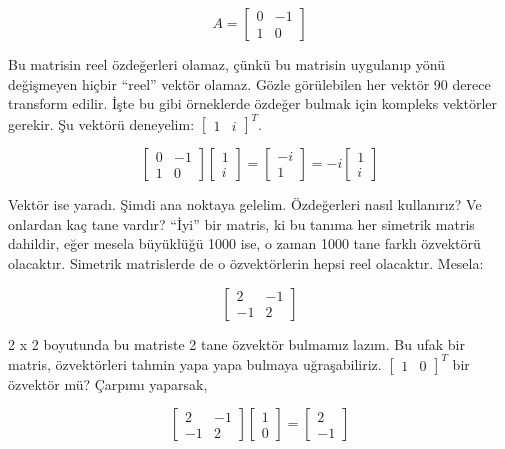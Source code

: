 \documentclass[12pt,fleqn]{article}\usepackage{../../common}
\begin{document}
$$ 
A = 
\left[
\begin{array}{rr}
0 & -1 \\
1 & 0
\end{array}
\right]
 $$

Bu matrisin reel özdeğerleri olamaz, çünkü bu matrisin uygulanıp yönü değişmeyen
hiçbir ``reel'' vektör olamaz. Gözle görülebilen her vektör 90 derece transform
edilir. İşte bu gibi örneklerde özdeğer bulmak için kompleks vektörler
gerekir. Şu vektörü deneyelim: $\left[\begin{array}{cc}1&i\end{array}\right]^T$.

$$ 
\left[\begin{array}{rr}
0 & -1 \\
1 & 0
\end{array}\right]
\left[\begin{array}{c}
1 \\
i
\end{array}\right]
= 
\left[\begin{array}{c}
-i \\
1
\end{array}\right]
= 
-i
\left[\begin{array}{c}
1 \\
i
\end{array}\right]
 $$

Vektör ise yaradı. Şimdi ana noktaya gelelim. Özdeğerleri nasıl
kullanırız? Ve onlardan kaç tane vardır? ``İyi'' bir matris, ki bu tanıma
her simetrik matris dahildir, eğer mesela büyüklüğü 1000 ise, o zaman
1000 tane farklı özvektörü olacaktır. Simetrik matrislerde de o
özvektörlerin hepsi reel olacaktır. Mesela:

$$ 
\left[\begin{array}{rr}
2 & -1 \\
-1 & 2
\end{array}\right]
 $$

2 x 2 boyutunda bu matriste 2 tane özvektör bulmamız lazım. Bu ufak bir matris,
özvektörleri tahmin yapa yapa bulmaya uğraşabiliriz.
$\left[\begin{array}{cc}1&0\end{array}\right]^T$ bir özvektör mü?  Çarpımı
yaparsak,

$$ 
\left[\begin{array}{rr}
2 & -1 \\
-1 & 2
\end{array}\right]
\left[\begin{array}{c}
1 \\
0
\end{array}\right]
=
\left[\begin{array}{r}
2 \\
-1
\end{array}\right]
 $$
\end{document}
